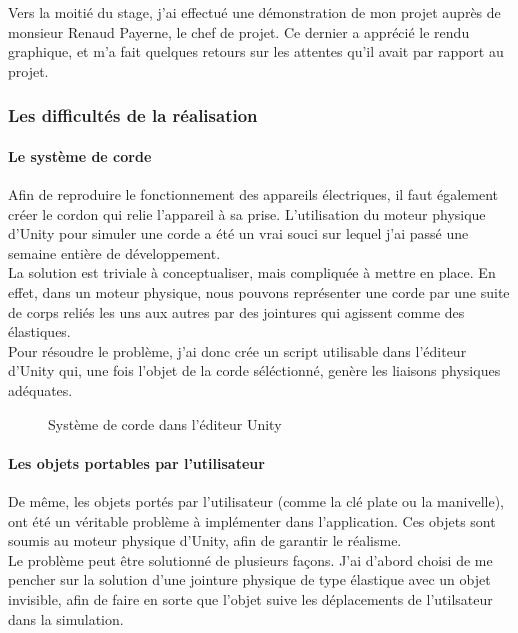 \documentclass[a4paper]{article}
\begin{document}
    Vers la moitié du stage, j'ai effectué une démonstration de mon projet auprès de monsieur Renaud Payerne, le chef de projet. Ce dernier a apprécié le rendu graphique, et m'a fait quelques retours sur les attentes qu'il avait par rapport au projet. \\

    \subsubsection{Les difficultés de la réalisation}

    \paragraph{Le système de corde}

    Afin de reproduire le fonctionnement des appareils électriques, il faut également créer le cordon qui relie l'appareil à sa prise. L'utilisation du moteur physique d'Unity pour simuler une corde a été un vrai souci sur lequel j'ai passé une semaine entière de développement. \\

    La solution est triviale à conceptualiser, mais compliquée à mettre en place. En effet, dans un moteur physique, nous pouvons représenter une corde par une suite de corps reliés les uns aux autres par des jointures qui agissent comme des élastiques. \\

    Pour résoudre le problème, j'ai donc crée un script utilisable dans l'éditeur d'Unity qui, une fois l'objet de la corde séléctionné, genère les liaisons physiques adéquates. \\ 

    \begin{figure}[H]
        \caption{Système de corde dans l'éditeur Unity}
    \end{figure}

    \paragraph{Les objets portables par l'utilisateur}

    De même, les objets portés par l'utilisateur (comme la clé plate ou la manivelle), ont été un véritable problème à implémenter dans l'application. Ces objets sont soumis au moteur physique d'Unity, afin de garantir le réalisme. \\

    Le problème peut être solutionné de plusieurs façons. J'ai d'abord choisi de me pencher sur la solution d'une jointure physique de type élastique avec un objet invisible, afin de faire en sorte que l'objet suive les déplacements de l'utilsateur dans la simulation. \\
\end{document}
